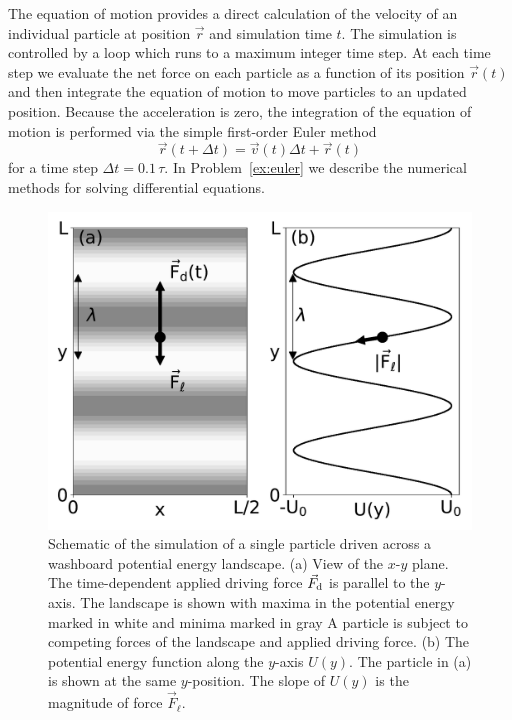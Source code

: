 \documentclass[preprint,showpacs,preprintnumbers,amsmath,amssymb,aps,prb]{revtex4-1}
\theoremstyle{remark}
\begin{document}
The equation of motion provides a direct calculation of the velocity
of an individual particle at position $\vec{r}$ 
and simulation time $t$.
The   simulation is controlled by a  loop
which runs to a maximum integer time step.
At each time step
we evaluate the net force on each particle as a function of its position
$\vec{r}(t)$
and then integrate
the equation of motion to move particles
to an updated position.
Because the acceleration is zero,
the integration of the equation of motion
is performed via 
the simple first-order Euler method 
\begin{equation}
  \vec{r}(t+\Delta t) = \vec{v}(t) \Delta t + \vec{r}(t)
    \label{eq:euler}
\end{equation}
for a time step $\Delta t = 0.1\,\tau$.
In 
Problem~\ref{ex:euler}
we describe 
the numerical methods for 
solving differential equations.
\begin{figure} %
\centering
\includegraphics[width=\columnwidth]{fig1_landscape.pdf}
\caption{
Schematic of the simulation of a single particle
  driven across a washboard potential energy landscape.
  (a) View of the $x$-$y$ plane. 
  The time-dependent applied driving force $\vec{F}_{\rm d}$
  is parallel to the $y$-axis.
  The landscape is shown with
  maxima in the potential energy marked in white %
  and minima marked in gray %
  A particle is 
  subject to competing forces of the landscape and applied driving force.
  (b) The potential energy function
  along the $y$-axis $U(y)$.  %
  The particle in (a) is shown at the same $y$-position.
  The slope of $U(y)$ %
  is the 
  magnitude of force $\vec{F}_{\ell}$. 
  }
\label{fig:1_landscape}
\end{figure}
%
\end{document}
